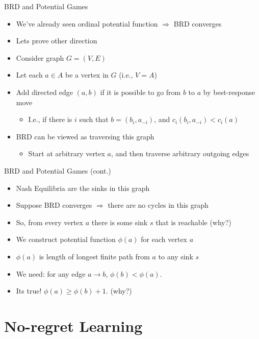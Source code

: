\documentclass[11pt,aspectratio=169]{beamer}
\begin{document}
  
  \begin{frame}{BRD and Potential Games}
   \begin{itemize}[<+->]
   \setlength{\itemsep}{0.7em}
    \item We've already seen ordinal potential function $\Rightarrow$ BRD converges
    \item Lets prove other direction
    \item Consider graph $G = (V,E)$
    \item Let each $a \in A$ be a vertex in $G$ (i.e., $V = A$)
    \item Add directed edge $(a,b)$ if it is possible to go from $b$ to $a$ by best-response move
    \begin{itemize}
     \item I.e., if there is $i$ such that $b = (b_i, a_{-i})$, and $c_i(b_i, a_{-i}) < c_i(a)$
    \end{itemize}
    \item BRD can be viewed as traversing this graph
    \begin{itemize}
     \item Start at arbitrary vertex $a$, and then traverse arbitrary outgoing edges
    \end{itemize}
   \end{itemize}
  \end{frame}


  \begin{frame}{BRD and Potential Games (cont.)}
   \begin{itemize}[<+->]
   \setlength{\itemsep}{0.7em}
    \item Nash Equilibria are the sinks in this graph
    \item Suppose BRD converges $\Rightarrow$ there are no cycles in this graph
    \item So, from every vertex $a$ there is some sink $s$ that is reachable (why?)
    \item We construct potential function $\phi(a)$ for each vertex $a$
    \item $\phi(a)$ is length of \alert{longest} finite path from $a$ to any sink $s$
    \item We need: for any edge $a \rightarrow b$, $\phi(b) < \phi(a)$.
    \item Its true! $\phi(a) \geq \phi(b) + 1$. (why?)
   \end{itemize}
  \end{frame}
  
  
 \section{No-regret Learning}
  
\end{document}
